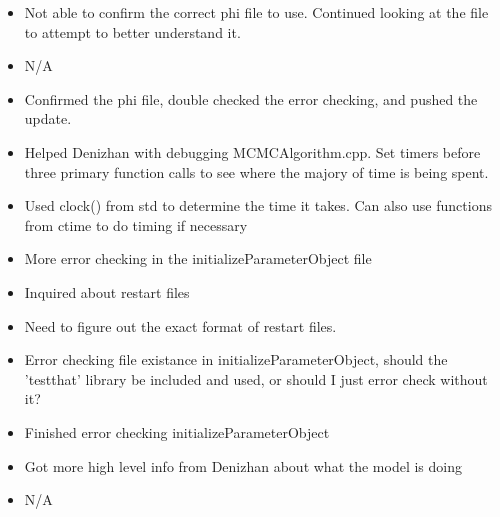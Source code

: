 \documentclass[12pt,hyperref]{labbook}
\begin{document}
\begin{itemize}
  \item Not able to confirm the correct phi file to use. Continued looking at
the  file to attempt to better understand it.  
\end{itemize}
\begin{itemize}
  \item N/A
\end{itemize}

\begin{itemize}
  \item Confirmed the phi file, double checked the error checking, and pushed
the update. 
  \item Helped Denizhan with debugging MCMCAlgorithm.cpp. Set timers before
three primary function calls to see where the majory of time is being spent.  
\end{itemize}
\begin{itemize}
  \item Used clock() from std to determine the time it takes. Can also use
functions from ctime to do timing if necessary
\end{itemize}

\begin{itemize}
  \item More error checking in the initializeParameterObject file
  \item Inquired about restart files 
\end{itemize}
\begin{itemize}
  \item Need to figure out the exact format of restart files. 
  \item Error checking file existance in initializeParameterObject, should the
'testthat' library be included and used, or should I just error check without
it?
\end{itemize}

\begin{itemize}
  \item Finished error checking initializeParameterObject
  \item Got more high level info from Denizhan about what the model is doing
\end{itemize}
\begin{itemize}
  \item N/A 
\end{itemize}
\end{document}
